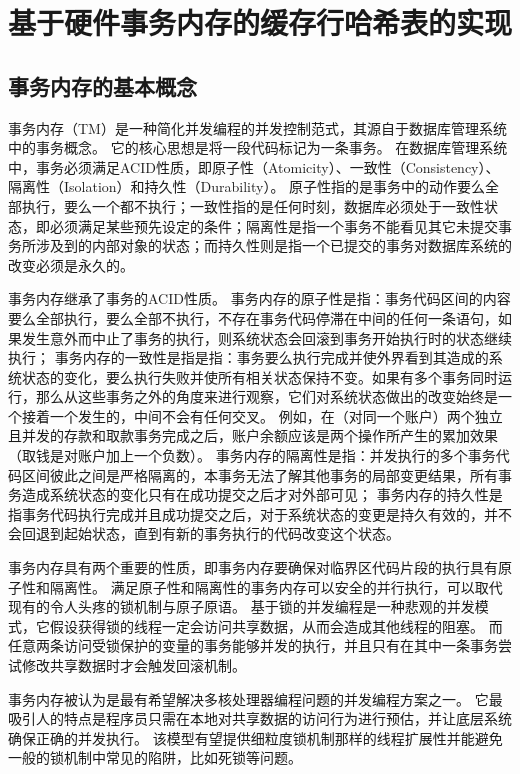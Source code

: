 
\chapter{基于硬件事务内存的缓存行哈希表的实现}

\section{事务内存的基本概念}
事务内存（TM）是一种简化并发编程的并发控制范式，其源自于数据库管理系统中的事务概念。
它的核心思想是将一段代码标记为一条事务。
在数据库管理系统中，事务必须满足ACID性质，即原子性（Atomicity）、一致性（Consistency）、隔离性（Isolation）和持久性（Durability）。
原子性指的是事务中的动作要么全部执行，要么一个都不执行；一致性指的是任何时刻，数据库必须处于一致性状态，即必须满足某些预先设定的条件；隔离性是指一个事务不能看见其它未提交事务所涉及到的内部对象的状态；而持久性则是指一个已提交的事务对数据库系统的改变必须是永久的。

事务内存继承了事务的ACID性质。
事务内存的原子性是指：事务代码区间的内容要么全部执行，要么全部不执行，不存在事务代码停滞在中间的任何一条语句，如果发生意外而中止了事务的执行，则系统状态会回滚到事务开始执行时的状态继续执行；
事务内存的一致性是指是指：事务要么执行完成并使外界看到其造成的系统状态的变化，要么执行失败并使所有相关状态保持不变。如果有多个事务同时运行，那么从这些事务之外的角度来进行观察，它们对系统状态做出的改变始终是一个接着一个发生的，中间不会有任何交叉。
例如，在（对同一个账户）两个独立且并发的存款和取款事务完成之后，账户余额应该是两个操作所产生的累加效果（取钱是对账户加上一个负数）。
事务内存的隔离性是指：并发执行的多个事务代码区间彼此之间是严格隔离的，本事务无法了解其他事务的局部变更结果，所有事务造成系统状态的变化只有在成功提交之后才对外部可见；
事务内存的持久性是指事务代码执行完成并且成功提交之后，对于系统状态的变更是持久有效的，并不会回退到起始状态，直到有新的事务执行的代码改变这个状态。

事务内存具有两个重要的性质，即事务内存要确保对临界区代码片段的执行具有原子性和隔离性。
满足原子性和隔离性的事务内存可以安全的并行执行，可以取代现有的令人头疼的锁机制与原子原语。
基于锁的并发编程是一种悲观的并发模式，它假设获得锁的线程一定会访问共享数据，从而会造成其他线程的阻塞。
而任意两条访问受锁保护的变量的事务能够并发的执行，并且只有在其中一条事务尝试修改共享数据时才会触发回滚机制。

事务内存被认为是最有希望解决多核处理器编程问题的并发编程方案之一。
它最吸引人的特点是程序员只需在本地对共享数据的访问行为进行预估，并让底层系统确保正确的并发执行。
该模型有望提供细粒度锁机制那样的线程扩展性并能避免一般的锁机制中常见的陷阱，比如死锁等问题。

